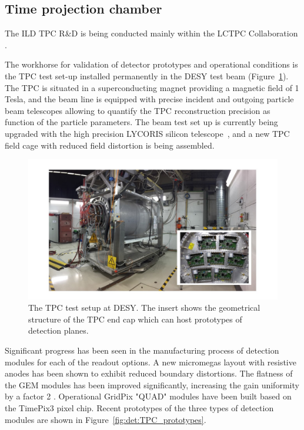 \subsection{Time projection chamber}

The ILD TPC R\&D is being conducted mainly within the LCTPC Collaboration \cite{ild:bib:TPC_lctpc}. 

The workhorse for validation of detector prototypes and operational conditions is the TPC test set-up installed permanently in the DESY test beam\cite{ild:bib:TPC_desytb} (Figure~\ref{fig:det:TPC_test_setup}). The TPC is situated in a superconducting magnet providing a magnetic field of 1 Tesla, and the beam line is equipped with precise incident and outgoing particle beam telescopes allowing to quantify the TPC reconstruction precision as function of the particle parameters. The beam test set up is currently being upgraded with the high precision LYCORIS silicon telescope~\cite{ild:bib:TPC_lycoris}, and a new TPC field cage with reduced field distortion is being assembled.

\begin{figure}[t!]
\centering
\includegraphics[width=1.0\hsize]{Detector/fig/TPC_test_setup.jpg}
\caption{The TPC test setup at DESY. The insert shows the geometrical structure of the TPC end cap which can host prototypes of detection planes.}
\label{fig:det:TPC_test_setup}
\end{figure}

Significant progress has been seen in the manufacturing process of detection modules for each of the readout options. A new micromegas layout with resistive anodes has been shown to exhibit reduced boundary distortions\cite{ild:bib:TPC_distortions}. The flatness of the GEM modules has been improved significantly, increasing the gain uniformity by a factor 2 \cite{ild:bib:TPC_GEMflatness}. Operational GridPix "QUAD" modules have been built based on the TimePix3 pixel chip\cite{ild:bib:TPC_quad}. Recent prototypes of the three types of detection modules are shown in Figure~\ref{fig:det:TPC_prototypes}.  

